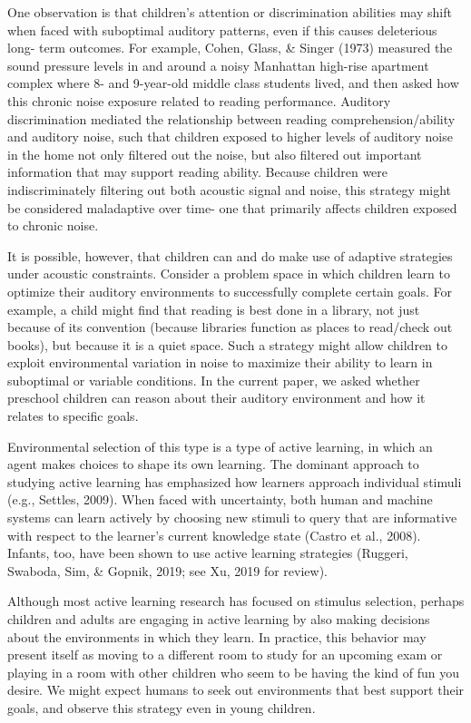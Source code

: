 \documentclass[10pt, letterpaper]{article}
\begin{document}
One observation is that children's attention or discrimination abilities
may shift when faced with suboptimal auditory patterns, even if this
causes deleterious long- term outcomes. For example, Cohen, Glass, \&
Singer (1973) measured the sound pressure levels in and around a noisy
Manhattan high-rise apartment complex where 8- and 9-year-old middle
class students lived, and then asked how this chronic noise exposure
related to reading performance. Auditory discrimination mediated the
relationship between reading comprehension/ability and auditory noise,
such that children exposed to higher levels of auditory noise in the
home not only filtered out the noise, but also filtered out important
information that may support reading ability. Because children were
indiscriminately filtering out both acoustic signal and noise, this
strategy might be considered maladaptive over time- one that primarily
affects children exposed to chronic noise.

It is possible, however, that children can and do make use of adaptive
strategies under acoustic constraints. Consider a problem space in which
children learn to optimize their auditory environments to successfully
complete certain goals. For example, a child might find that reading is
best done in a library, not just because of its convention (because
libraries function as places to read/check out books), but because it is
a quiet space. Such a strategy might allow children to exploit
environmental variation in noise to maximize their ability to learn in
suboptimal or variable conditions. In the current paper, we asked
whether preschool children can reason about their auditory environment
and how it relates to specific goals.

Environmental selection of this type is a type of active learning, in
which an agent makes choices to shape its own learning. The dominant
approach to studying active learning has emphasized how learners
approach individual stimuli (e.g., Settles, 2009). When faced with
uncertainty, both human and machine systems can learn actively by
choosing new stimuli to query that are informative with respect to the
learner's current knowledge state (Castro et al., 2008). Infants, too,
have been shown to use active learning strategies (Ruggeri, Swaboda,
Sim, \& Gopnik, 2019; see Xu, 2019 for review).

Although most active learning research has focused on stimulus
selection, perhaps children and adults are engaging in active learning
by also making decisions about the environments in which they learn. In
practice, this behavior may present itself as moving to a different room
to study for an upcoming exam or playing in a room with other children
who seem to be having the kind of fun you desire. We might expect humans
to seek out environments that best support their goals, and observe this
strategy even in young children.
\end{document}
